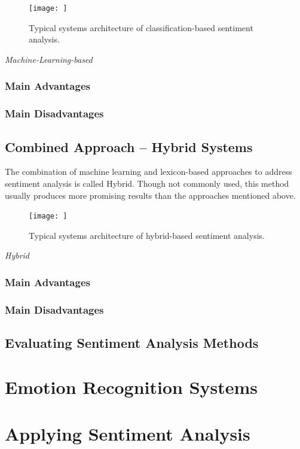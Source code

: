 \begin{figure}[h]
 \centering
 \texttt{[image: ]}
 \caption{Typical systems architecture of classification-based sentiment analysis.}
 \label{fig:dictionary-based-framekwork}
\end{figure}

\begin{algorithm}[H]
\caption{\textit{Machine-Learning-based}}
\label{array-sum}
\begin{algorithmic}[1]
\EndProcedure
\end{algorithmic}
\end{algorithm}
\subsubsection{Main Advantages}
\subsubsection{Main Disadvantages}
\subsection{Combined Approach -- Hybrid Systems}
The combination of machine learning and lexicon-based approaches to address sentiment analysis is called Hybrid. Though not commonly used, this method usually produces more promising results than the approaches mentioned above.

\begin{figure}[h]
 \centering
 \texttt{[image: ]}
 \caption{Typical systems architecture of hybrid-based sentiment analysis.}
 \label{fig:dictionary-based-framekwork}
\end{figure}

\begin{algorithm}[H]
\caption{\textit{Hybrid}}
\label{array-sum}
\begin{algorithmic}[1]
\EndProcedure
\end{algorithmic}
\end{algorithm}
\subsubsection{Main Advantages}
\subsubsection{Main Disadvantages}
\subsection{Evaluating Sentiment Analysis Methods}
\section{Emotion Recognition Systems}
\section{Applying Sentiment Analysis}
